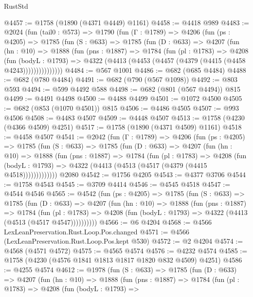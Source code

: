 \begin{lexlean}{RustStd}
\begin{coremodule}
@4457 := @1758 (@1890 (@4371 @4449) @1161)
@4458 := @4418 @989
@4483 := @2024
    (fun (tail0 : @573) =>
    @1790
      (fun (Γ : @1789) =>
      @4206
        (fun (ps : @4205) =>
        @1785
          (fun (S : @633) =>
          @1785
            (fun (D : @633) =>
            @4207
              (fun (hn : @10) =>
              @1888
                (fun (pns : @1887) =>
                @1784
                  (fun (pl : @1783) =>
                  @4208
                    (fun (bodyL : @1793) =>
                    @4322 (@4413 (@4453 (@4457 (@4379 (@4415 (@4458 @4243)))))))))))))))
@4484 := @567 @1001
@4486 := @682 (@685 @4484)
@4488 := @682 (@780 @4484)
@4491 := @682 (@790 (@567 @1098))
@4492 := @803 @593
@4494 := @599 @4492 @588
@4498 := @682 (@801 (@567 @4494)) @815
@4499 := @4491 @4498
@4500 := @4488 @4499
@4501 := @1072 @4500
@4505 := @682 (@853 (@1070 @4501)) @815
@4506 := @4486 @4505
@4507 := @993 @4506
@4508 := @4483 @4507
@4509 := @4448 @4507
@4513 := @1758 (@4230 (@4366 @4509) @4251)
@4517 := @1758 (@1890 (@4371 @4509) @1161)
@4518 := @4458 @4507
@4541 := @2042
    (fun (Γ : @1789) =>
    @4206
      (fun (ps : @4205) =>
      @1785
        (fun (S : @633) =>
        @1785
          (fun (D : @633) =>
          @4207
            (fun (hn : @10) =>
            @1888
              (fun (pns : @1887) =>
              @1784
                (fun (pl : @1783) =>
                @4208
                  (fun (bodyL : @1793) =>
                  @4322 (@4413 (@4513 (@4517 (@4379 (@4415 @4518)))))))))))))
    @2080
@4542 := @1756 @4205
@4543 := @4377 @3706
@4544 := @1758 @4543
@4545 := @3709 @4414
@4546 := @4545 @4518
@4547 := @4544 @4546
@4565 := @4542
    (fun (ps : @4205) =>
    @1785
      (fun (S : @633) =>
      @1785
        (fun (D : @633) =>
        @4207
          (fun (hn : @10) =>
          @1888
            (fun (pns : @1887) =>
            @1784
              (fun (pl : @1783) =>
              @4208 (fun (bodyL : @1793) => @4322 (@4413 (@4513 (@4517 @4547))))))))))
@4566 := @6 @4204
@4568 := @4566 LexLeanPreservation.Rust.Loop.Pos.changed
@4571 := @4566 (LexLeanPreservation.Rust.Loop.Pos.kept @530)
@4572 := @2 @4204
@4574 := @4568 (@4571 @4572)
@4575 := @4565 @4574
@4576 := @4232 @4574
@4585 := @1758 (@4230 (@4576 @1841 @1813 @1817 @1820 @832 @4509) @4251)
@4586 := @4255 @4574
@4612 := @1978
    (fun (S : @633) =>
    @1785
      (fun (D : @633) =>
      @4207
        (fun (hn : @10) =>
        @1888
          (fun (pns : @1887) =>
          @1784
            (fun (pl : @1783) =>
            @4208
              (fun (bodyL : @1793) =>

\end{coremodule}
\end{lexlean}

